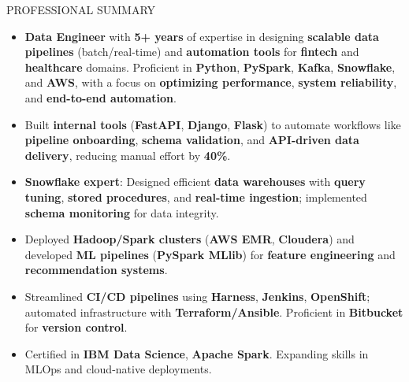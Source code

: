 \documentclass{resume} %
\begin{document}

\begin{rSection}{ PROFESSIONAL SUMMARY}
\begin{itemize}
    \item \textbf{Data Engineer} with \textbf{5+ years} of expertise in designing \textbf{scalable data pipelines} (batch/real-time) and \textbf{automation tools} for \textbf{fintech} and \textbf{healthcare} domains. Proficient in \textbf{Python}, \textbf{PySpark}, \textbf{Kafka}, \textbf{Snowflake}, and \textbf{AWS}, with a focus on \textbf{optimizing performance}, \textbf{system reliability}, and \textbf{end-to-end automation}.
    
    \item Built \textbf{internal tools} (\textbf{FastAPI}, \textbf{Django}, \textbf{Flask}) to automate workflows like \textbf{pipeline onboarding}, \textbf{schema validation}, and \textbf{API-driven data delivery}, reducing manual effort by \textbf{40\%}.
    
    \item \textbf{Snowflake expert}: Designed efficient \textbf{data warehouses} with \textbf{query tuning}, \textbf{stored procedures}, and \textbf{real-time ingestion}; implemented \textbf{schema monitoring} for data integrity.
    
    \item Deployed \textbf{Hadoop/Spark clusters} (\textbf{AWS EMR}, \textbf{Cloudera}) and developed \textbf{ML pipelines} (\textbf{PySpark MLlib}) for \textbf{feature engineering} and \textbf{recommendation systems}.
    
    \item Streamlined \textbf{CI/CD pipelines} using \textbf{Harness}, \textbf{Jenkins}, \textbf{OpenShift}; automated infrastructure with \textbf{Terraform/Ansible}. Proficient in \textbf{Bitbucket} for \textbf{version control}.
    
    \item Certified in \textbf{IBM Data Science}, \textbf{Apache Spark}. Expanding skills in MLOps and cloud-native deployments.
\end{itemize}
\end{rSection}
\end{document}

